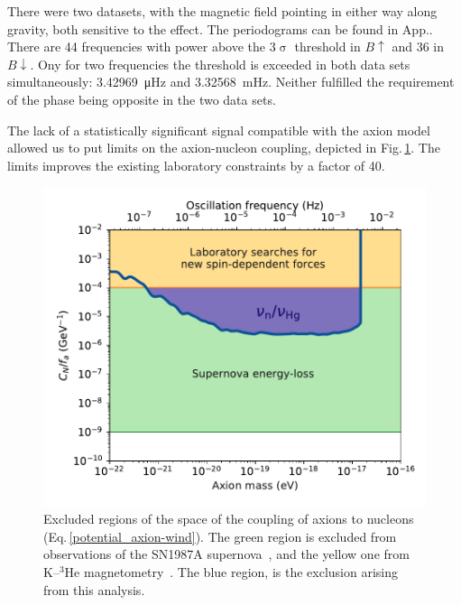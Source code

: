 There were two datasets, with the magnetic field pointing in either way along gravity, both sensitive to the effect.
The periodograms can be found in App..
There are 44 frequencies with power above the 3$\upsigma$ threshold in $B\uparrow$ and 36 in $B\downarrow$.
Ony for two frequencies the threshold is exceeded in both data sets simultaneously: \SI{3.42969}{\micro\hertz} and \SI{3.32568}{\milli\hertz}.
Neither  fulfilled the requirement of the phase being opposite in the two data sets.

The lack of a statistically significant signal compatible with the axion model allowed us to put limits on the axion-nucleon coupling, depicted in Fig.\,\ref{fig:axions_wind_limits}. The limits improves the existing laboratory constraints by a factor of 40.

\begin{figure}
  \centering
  \includegraphics[width=\linewidth]{gfx/axions/psi_ill_axion_wind_limits_v1.pdf}
  \caption{Excluded regions of the space of the coupling of axions to nucleons (Eq.\,\ref{potential_axion-wind}). The green region is excluded from observations of the SN1987A supernova~\cite{PhysRevX.7.041034}, and the yellow one from K--${}^3$He magnetometry~\cite{Romalis2009_NF}. The blue region, is the exclusion arising from this analysis.}\label{fig:axions_wind_limits}
\end{figure}





